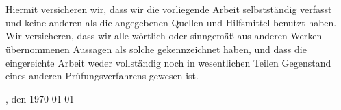 \chapter*{}
\vspace*{0.5cm}
\noindent

Hiermit versicheren wir, dass wir die vorliegende Arbeit selbstständig verfasst und keine anderen als die angegebenen Quellen und Hilfsmittel benutzt haben. Wir versicheren, dass wir alle wörtlich oder sinngemäß aus anderen Werken übernommenen Aussagen als solche gekennzeichnet haben, und dass die eingereichte Arbeit weder vollständig noch in wesentlichen Teilen Gegenstand eines anderen Prüfungsverfahrens gewesen ist.

\vspace{3cm}
\toponym, den \today